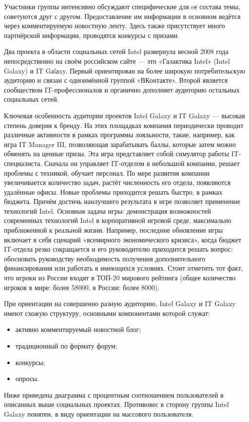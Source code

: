 \documentclass[a4paper,english,russian]{G2-105}
\begin{document}
\par Участники группы интенсивно обсуждают специфические для eе состава темы, советуются друг с другом. Предоставление им информации в основном ведётся через комментируемую новостную ленту. Здесь также присутствует много партнёрской информации, проводятся конкурсы с призами.
\par Два проекта в области социальных сетей Intel развернула весной 2008 года непосредственно на своём российском сайте — это «Галактика Intel» (Intel Galaxy) и IT Gаlаxy. Первый ориентирован на более широкую потребительскую аудиторию и связан с одноимённой группой «ВКонтакте». Второй является сообществом IT-профессионалов и органично дополняет аудиторию остальных социальных сетей.
\par Ключевая особенность аудитории проектов Intel Galaxy и IT Galaxy — высокая степень доверия к бренду. На этих площадках компания периодически проводит различные активности в рамках программы лояльности, такие, например, как игра IT Manager III, позволяющая зарабатывать баллы, которые затем можно обменять на ценные призы. Эта игра представляет собой симулятор работы IT-специалиста. Сначала он управляет IT-отделом в небольшой компании, решает проблемы с техникой, обучает персонал. По мере развития компании увеличивается количество задач, растёт численность его отдела, появляются удалённые офисы. Новые проблемы приходится решать быстро, в рамках бюджета. Причём достичь наилучшего результата в игре позволяет применение технологий Intel. Основная задача игры: демонстрация возможностей современных технологий Intel в корпоративной игровой среде, максимально приближенной к реальной жизни. Например, последние обновление игры включает в себя сценарий «всемирного экономического кризиса», когда бюджет IT-отдела резко сокращается и его руководителю приходится решать вопрос: обосновать руководству необходимость получения дополнительного финансирования или работать в имеющихся условиях. Стоит отметить тот факт, что игроки из России входят в ТОП-20 мирового рейтинга (общее количество игроков в мире: более 58000, в России: более 8000).
\par При ориентации на совершенно разную аудиторию, Intel Galaxy и IT Galaxy имеют схожую структуру, основными компонентами которой служат:
\begin{itemize}
\item активно комментируемый новостной блог;
\item традиционный по формату форум;
\item конкурсы;
\item опросы.
\end{itemize}
\item Ниже приведена диаграмма с процентным соотношением пользователей в описанных выше социальных проектах. Противовес в сторону группы Intel Galaxy понятен, в виду ориентации на массового пользователя.
\end{document}
